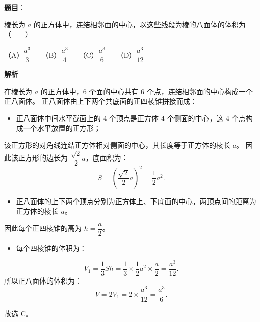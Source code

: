 \begin{answer}

\textbf{题目}：

棱长为 $a$ 的正方体中，连结相邻面的中心，以这些线段为棱的八面体的体积为\mbox{（　　）}

（A）$\dfrac{a^3}{3}$　　（B）$\dfrac{a^3}{4}$　　（C）$\dfrac{a^3}{6}$　　（D）$\dfrac{a^3}{12}$

\textbf{解析}

在棱长为 $a$ 的正方体中，6 个面的中心共有 6 个点，连结相邻面的中心构成一个正八面体。
正八面体由上下两个共底面的正四棱锥拼接而成：
\begin{itemize}
\item 正八面体中间水平截面上的 4 个顶点是正方体 4 个侧面的中心，这 4 个点构成一个水平放置的正方形；
\end{itemize}
  该正方形的对角线连结正方体相对侧面的中心，其长度等于正方体的棱长 $a$。
  因此该正方形的边长为 $\dfrac{\sqrt{2}}{2} a$，底面积为：
\nopagebreak[4]
\[S = \left(\frac{\sqrt{2}}{2} a\right)^2 = \frac{1}{2} a^2.\]
\begin{itemize}
\item 正八面体的上下两个顶点分别为正方体上、下底面的中心，两顶点间的距离为正方体的棱长 $a$。
\end{itemize}
  因此每个正四棱锥的高为 $h = \dfrac{a}{2}$。
\begin{itemize}
\item 每个四棱锥的体积为：
\end{itemize}
\nopagebreak[4]
\[V_1 = \frac{1}{3} S h = \frac{1}{3} \times \frac{1}{2} a^2 \times \frac{a}{2} = \frac{a^3}{12}.\]
所以正八面体的体积为：
\nopagebreak[4]
\[V = 2 V_1 = 2 \times \frac{a^3}{12} = \frac{a^3}{6}.\]

故选 C。


\end{answer}
